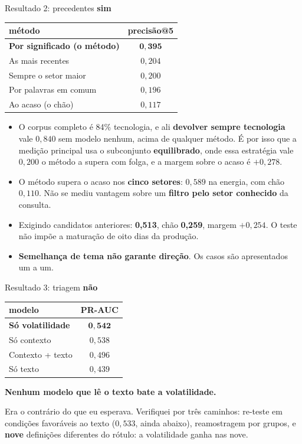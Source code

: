 \documentclass[aspectratio=169]{beamer}
\begin{document}
\begin{frame}{Resultado 2: precedentes \textcolor{green!50!black}{\textbf{sim}}}
\centering
\begin{tabular}{lc}
\toprule
\textbf{método} & \textbf{precisão@5} \\
\midrule
\textbf{Por significado (o método)} & $\mathbf{0{,}395}$ \\
As mais recentes & $0{,}204$ \\
Sempre o setor maior & $0{,}200$ \\
Por palavras em comum & $0{,}196$ \\
Ao acaso (o chão) & $0{,}117$ \\
\bottomrule
\end{tabular}
\vspace{2mm}

\begin{itemize}
  \small
  \item O corpus completo é 84\% tecnologia, e ali \textbf{devolver sempre tecnologia} vale
        $0{,}840$ sem modelo nenhum, acima de qualquer método. É por isso que a medição
        principal usa o subconjunto \textbf{equilibrado}, onde essa estratégia vale $0{,}200$
        o método a supera com folga, e a margem sobre o acaso é $+0{,}278$.
  \item O método supera o acaso nos \textbf{cinco setores}: $0{,}589$ na energia, com chão $0{,}110$.
        Não se mediu vantagem sobre um \textbf{filtro pelo setor conhecido} da consulta.
  \item Exigindo candidatos anteriores: \textbf{0{,}513}, chão \textbf{0{,}259}, margem
        \textbf{$+0{,}254$}. O teste não impõe a maturação de oito dias da produção.
  \item \textbf{Semelhança de tema não garante direção}. Os casos são apresentados um a um.
\end{itemize}
\end{frame}

\begin{frame}{Resultado 3: triagem \textcolor{red!60!black}{\textbf{não}}}
\centering
\begin{tabular}{lc}
\toprule
\textbf{modelo} & \textbf{PR-AUC} \\
\midrule
\textbf{Só volatilidade} & $\mathbf{0{,}542}$ \\
Só contexto & $0{,}538$ \\
Contexto + texto & $0{,}496$ \\
Só texto & $0{,}439$ \\
\bottomrule
\end{tabular}
\vspace{3mm}

\begin{center}
\textbf{Nenhum modelo que lê o texto bate a volatilidade.}
\end{center}
\vspace{2mm}
\footnotesize
Era o contrário do que eu esperava. Verifiquei por três caminhos:
re-teste em condições favoráveis ao texto ($0{,}533$, ainda abaixo),
reamostragem por grupos, e \textbf{nove} definições diferentes do rótulo: a volatilidade ganha
nas nove.
\end{frame}
\end{document}
